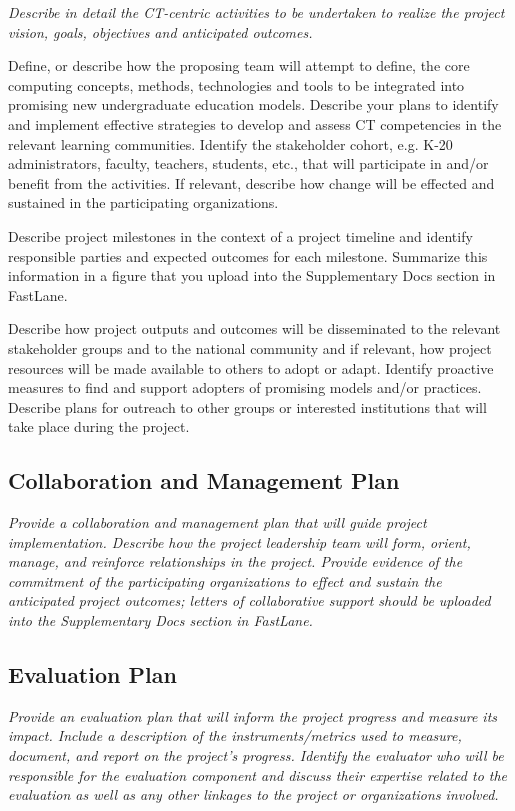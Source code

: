 {\em Describe in detail the CT-centric activities to be undertaken to realize the project vision, goals, objectives and anticipated outcomes. 

Define, or describe how the proposing team will attempt to define, the core computing concepts, methods, technologies and tools to be integrated into promising new undergraduate education models.  Describe your plans to identify and implement effective strategies to develop and assess CT competencies in the relevant learning communities.  Identify the stakeholder cohort, e.g. K-20 administrators, faculty, teachers, students, etc., that will participate in and/or benefit from the activities. If relevant, describe how change will be effected and sustained in the participating organizations.  

Describe project milestones in the context of a project timeline and identify responsible parties and expected outcomes for each milestone.  Summarize this information in a figure that you upload into the Supplementary Docs section in FastLane. 

Describe how project outputs and outcomes will be disseminated to the relevant stakeholder groups and to the national community and if relevant, how project resources will be made available to others to adopt or adapt. Identify proactive measures to find and support adopters of promising models and/or practices. Describe plans for outreach to other groups or interested institutions that will take place during the project.  
}

\subsection*{Collaboration and Management Plan}

{\em Provide a collaboration and management plan that will guide project implementation.  Describe how the project leadership team will form, orient, manage, and reinforce relationships in the project.  Provide evidence of the commitment of the participating organizations to effect and sustain the anticipated project outcomes; letters of collaborative support should be uploaded into the Supplementary Docs section in FastLane. }

\subsection*{Evaluation Plan}

{\em Provide an evaluation plan that will inform the project progress and measure its impact.  Include a description of the instruments/metrics used to measure, document, and report on the project's progress.  Identify the evaluator who will be responsible for the evaluation component and discuss their expertise related to the evaluation as well as any other linkages to the project or organizations involved.  }







